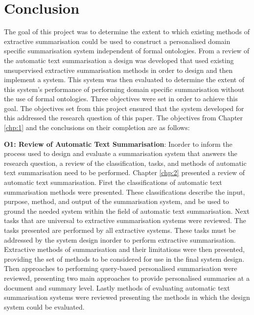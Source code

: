 \chapter{Conclusion}
\label{chp:7}
The goal of this project was to determine the extent to which existing methods of extractive summarisation could be used to construct a personalised domain specific summarisation system independent of formal ontologies. From a review of the automatic text summarisation a design was developed that used existing unsupervised extractive summarisation methods in order to design and then implement a system. This system was then evaluated to determine the extent of this system's performance of performing domain specific summarisation without the use of formal ontologies. Three objectives were set in order to achieve this goal. The objectives set from this project ensured that the system developed for this addressed the research question of this paper. The objectives from Chapter \ref{chp:1} and the conclusions on their completion are as follows:

\textbf{O1: Review of Automatic Text Summarisation}:
Inorder to inform the process used to design and evaluate a summarisation system that answers the research question, a review of the classification, tasks, and methods of automatic text summarisation need to be performed. Chapter \ref{chp:2} presented a review of automatic text summarisation. First the classifications of automatic text summarisation methods were presented. These classifications describe the input, purpose, method, and output of the summarisation system, and be used to ground the needed system within the field of automatic text summarisation. Next tasks that are universal to extractive summarisation systems were reviewed. The tasks presented are performed by all extractive systems. These tasks must be addressed by the system design inorder to perform extractive summarisation. Extractive methods of summarisation and their limitations were then presented, providing the set of methods to be considered for use in the final system design. Then approaches to performing query-based personalised summarisation were reviewed, presenting two main approaches to provide personalised summaries at a document and summary level. Lastly methods of evaluating automatic text summarisation systems were reviewed presenting the methods in which the design system could be evaluated. 

